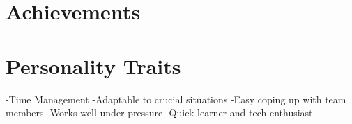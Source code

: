 \documentclass[letterpaper]{twentysecondcv} %
\begin{document}



\section{Achievements}

\begin{twentyshort} %
\end{twentyshort}



\section{Personality Traits}

-Time Management
\newline-Adaptable to crucial situations
\newline-Easy coping up with team members
\newline-Works well under pressure
\newline-Quick learner and tech enthusiast



%
%
%
%



%
%
\end{document}
